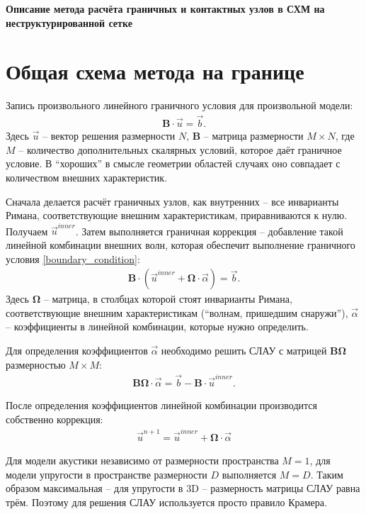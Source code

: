 \begin{center}
	\Large\textbf{{{Описание метода расчёта граничных и контактных узлов в СХМ на неструктурированной сетке}}}
\end{center}


\section{Общая схема метода на границе}

Запись произвольного линейного граничного условия для произвольной модели:
\begin{eqnarray}
\label{boundary_condition}
	\mathbf{B} \cdot \vec{u} = \vec{b}.
\end{eqnarray}
Здесь $\vec{u}$ -- вектор решения размерности $N$, $\mathbf{B}$ -- матрица размерности $M \times N$, где $M$ -- количество дополнительных скалярных условий, которое даёт граничное условие. В ``хороших'' в смысле геометрии областей случаях оно совпадает с количеством внешних характеристик.

Сначала делается расчёт граничных узлов, как внутренних -- все инварианты Римана, соответствующие внешним характеристикам, приравниваются к нулю. Получаем $\vec{u}^{inner}$. Затем выполняется граничная коррекция -- добавление такой линейной комбинации внешних волн, которая обеспечит выполнение граничного условия \eqref{boundary_condition}:
\begin{eqnarray}
	\mathbf{B} \cdot (\vec{u}^{inner} + \mathbf{\Omega} \cdot \vec{\alpha}) = \vec{b}.
\end{eqnarray}
Здесь $\mathbf{\Omega}$ -- матрица, в столбцах которой стоят инварианты Римана, соответствующие внешним характеристикам (``волнам, пришедшим снаружи''), $\vec{\alpha}$ -- коэффициенты в линейной комбинации, которые нужно определить.

Для определения коэффициентов $\vec{\alpha}$ необходимо решить СЛАУ с матрицей $\mathbf{B} \mathbf{\Omega}$ размерностью $M \times M$:
\begin{eqnarray}
	\mathbf{B} \mathbf{\Omega} \cdot \vec{\alpha} = \vec{b} - \mathbf{B} \cdot \vec{u}^{inner}.
\end{eqnarray}

После определения коэффициентов линейной комбинации производится собственно коррекция:
\begin{eqnarray}
\vec{u}^{n+1} = \vec{u}^{inner} + \mathbf{\Omega} \cdot \vec{\alpha}
\end{eqnarray}

Для модели акустики независимо от размерности пространства $M = 1$, для модели упругости в пространстве размерности $D$ выполняется $M = D$. Таким образом максимальная -- для упругости в 3D -- размерность матрицы СЛАУ равна трём. Поэтому для решения СЛАУ используется просто правило Крамера.

